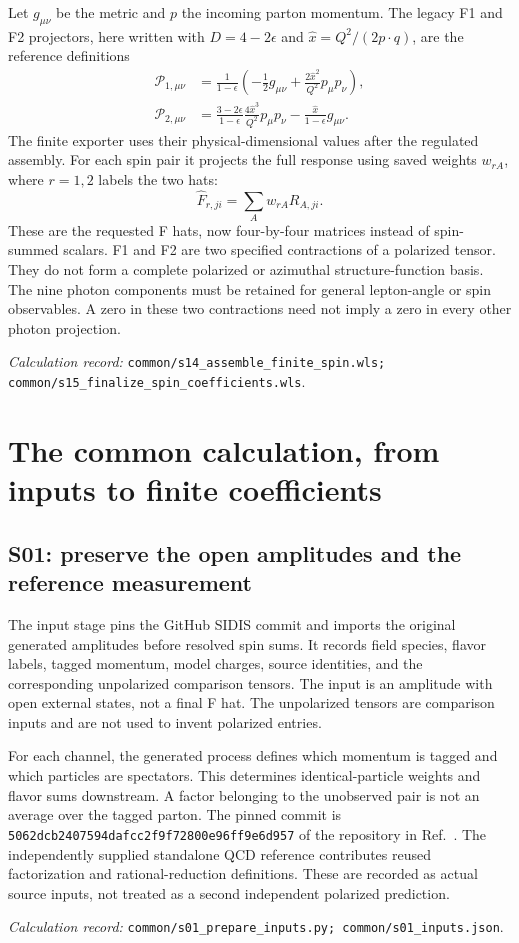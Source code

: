 \documentclass[11pt,a4paper]{article}
\newcommand{\eps}{\epsilon}
\newcommand{\code}[1]{{\small\nolinkurl{#1}}}
\newcommand{\pathref}[1]{\par{\footnotesize\textit{Calculation record:} \code{#1}.}\par}
\begin{document}
Let $g_{\mu\nu}$ be the metric and $p$ the incoming parton momentum. The legacy F1 and F2 projectors, here written with $D=4-2\eps$ and $\widehat x=Q^2/(2p\cdot q)$, are the reference definitions
\begin{align}
 \mathcal P_{1,\mu\nu}&=\frac{1}{1-\eps}
 \left(-\frac12g_{\mu\nu}+\frac{2\widehat x^2}{Q^2}p_\mu p_\nu\right),\\
 \mathcal P_{2,\mu\nu}&=\frac{3-2\eps}{1-\eps}
 \frac{4\widehat x^3}{Q^2}p_\mu p_\nu
 -\frac{\widehat x}{1-\eps}g_{\mu\nu}.
\end{align}
The finite exporter uses their physical-dimensional values after the regulated assembly. For each spin pair it projects the full response using saved weights $w_{rA}$, where $r=1,2$ labels the two hats:
\begin{equation}
 \widehat F_{r,ji}=\sum_A w_{rA}R_{A,ji}.
\end{equation}
These are the requested F hats, now four-by-four matrices instead of spin-summed scalars. F1 and F2 are two specified contractions of a polarized tensor. They do not form a complete polarized or azimuthal structure-function basis. The nine photon components must be retained for general lepton-angle or spin observables. A zero in these two contractions need not imply a zero in every other photon projection.
\pathref{common/s14_assemble_finite_spin.wls; common/s15_finalize_spin_coefficients.wls}

\section{The common calculation, from inputs to finite coefficients}
\subsection{S01: preserve the open amplitudes and the reference measurement}
The input stage pins the GitHub SIDIS commit and imports the original generated amplitudes before resolved spin sums. It records field species, flavor labels, tagged momentum, model charges, source identities, and the corresponding unpolarized comparison tensors. The input is an amplitude with open external states, not a final F hat. The unpolarized tensors are comparison inputs and are not used to invent polarized entries.

For each channel, the generated process defines which momentum is tagged and which particles are spectators. This determines identical-particle weights and flavor sums downstream. A factor belonging to the unobserved pair is not an average over the tagged parton. The pinned commit is \code{5062dcb2407594dafcc2f9f72800e96ff9e6d957} of the repository in Ref.~\cite{github}. The independently supplied standalone QCD reference contributes reused factorization and rational-reduction definitions. These are recorded as actual source inputs, not treated as a second independent polarized prediction.
\pathref{common/s01_prepare_inputs.py; common/s01_inputs.json}
\end{document}
